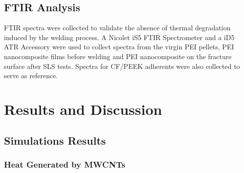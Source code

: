 \documentclass[11pt,review,times]{elsarticle}
\begin{document}
\FloatBarrier
\subsection{FTIR Analysis}

FTIR spectra were collected to validate the absence of thermal degradation induced by the welding process. 
A Nicolet iS5 FTIR Spectrometer and a iD5 ATR Accessory were used to collect spectra from the virgin PEI pellets, PEI nanocomposite films before welding and PEI nanocomposite on the fracture surface after SLS tests. 
Spectra for CF/PEEK adherents were also collected to serve as reference.  


\FloatBarrier
							\section{Results and Discussion}

\subsection{Simulations Results}

\subsubsection{Heat Generated by MWCNTs}
	\label{subsection:mechanism1}
\end{document}
